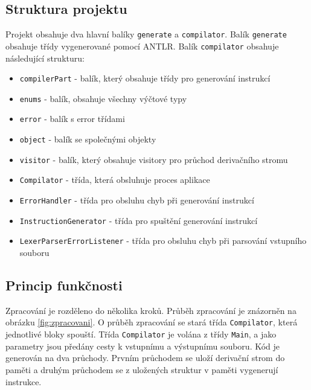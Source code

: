\documentclass[12pt, a4paper]{article}
\begin{document}
\subsection{Struktura projektu}
Projekt obsahuje dva hlavní balíky \texttt{generate} a \texttt{compilator}. Balík \texttt{generate} obsahuje třídy vygenerované pomocí \textsf{ANTLR}. Balík \texttt{compilator} obsahuje následující strukturu:
\begin{itemize}
\item \texttt{compilerPart} - balík, který obsahuje třídy pro generování instrukcí
\item \texttt{enums} - balík, obsahuje všechny výčtové typy
\item \texttt{error} - balík s error třídami
\item \texttt{object} - balík se společnými objekty
\item \texttt{visitor} - balík, který obsahuje visitory pro průchod derivačního stromu
\item \texttt{Compilator} - třída, která obsluhuje proces aplikace
\item \texttt{ErrorHandler} - třída pro obsluhu chyb při generování instrukcí
\item \texttt{InstructionGenerator} - třída pro spuštění generování instrukcí
\item \texttt{LexerParserErrorListener} - třída pro obsluhu chyb při parsování vstupního souboru
\end{itemize}

\subsection{Princip funkčnosti}
\noindent Zpracování je rozděleno do několika kroků. Průběh zpracování je znázorněn na obrázku \ref{fig:zpracovani}. O průběh zpracování se stará třída \texttt{Compilator}, která jednotlivé bloky spouští. Třída \texttt{Compilator} je volána z třídy \texttt{Main}, a jako parametry jsou předány cesty k vstupnímu a výstupnímu souboru. Kód je generován na dva průchody. Prvním průchodem se uloží derivační strom do paměti a druhým průchodem se z uložených struktur v paměti vygenerují instrukce.
\end{document}
